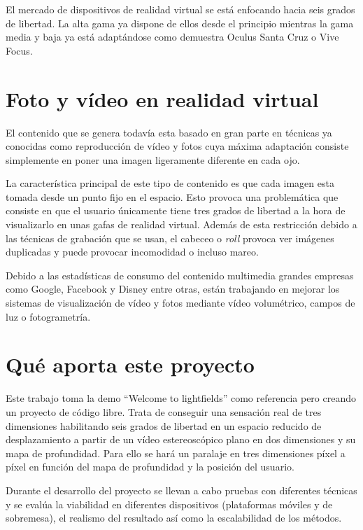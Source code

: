 El mercado de dispositivos de realidad virtual se está enfocando hacia seis grados de libertad. La alta gama ya dispone de ellos desde el principio mientras la gama media y baja ya está adaptándose como demuestra Oculus Santa Cruz o Vive Focus.

\section{Foto y vídeo en realidad virtual}
El contenido que se genera todavía esta basado en gran parte en técnicas ya conocidas como reproducción de vídeo y fotos cuya máxima adaptación consiste simplemente en poner una imagen ligeramente diferente en cada ojo.

La característica principal de este tipo de contenido es que cada imagen esta tomada desde un punto fijo en el espacio. Esto provoca una problemática que consiste en que el usuario únicamente tiene tres grados de libertad a la hora de visualizarlo en unas gafas de realidad virtual. Además de esta restricción debido a las técnicas de grabación que se usan, el cabeceo o \textit{roll} provoca ver imágenes duplicadas y puede provocar incomodidad o incluso mareo.

Debido a las estadísticas de consumo del contenido multimedia grandes empresas como Google, Facebook y Disney entre otras, están trabajando en mejorar los sistemas de visualización de vídeo y fotos mediante vídeo volumétrico, campos de luz o fotogrametría.


\section{Qué aporta este proyecto}
Este trabajo toma la demo ``Welcome to lightfields'' como referencia pero creando un proyecto de código libre. Trata de conseguir una sensación real de tres dimensiones habilitando seis grados de libertad en un espacio reducido de desplazamiento a partir de un vídeo estereoscópico plano en dos dimensiones y su mapa de profundidad. Para ello se hará un paralaje en tres dimensiones píxel a píxel en función del mapa de profundidad y la posición del usuario.

Durante el desarrollo del proyecto se llevan a cabo pruebas con diferentes técnicas y se evalúa la viabilidad en diferentes dispositivos (plataformas móviles y de sobremesa), el realismo del resultado así como la escalabilidad de los métodos.

















